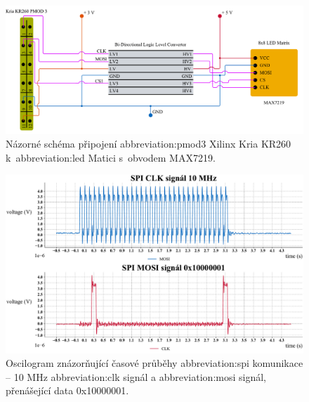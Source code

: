 \documentclass[a4paper, twoside, 11pt]{article}
\begin{document}
	\begin{figure}[htbp!]
		\centering
		\includegraphics[width=1\textwidth]{src/pdf/spi-test-connection.pdf}
		\caption{Názorné schéma připojení \gls{abbreviation:pmod}3 Xilinx Kria KR260 k~\gls{abbreviation:led} Matici s~obvodem MAX7219.}
		\label{fig:spi-test-connection}
	\end{figure}

	\begin{figure}[htbp!]
		\centering
		\includegraphics[width=1\textwidth]{src/python-graph/spi-osciloscope-data/pdf/clk-data-full-graph.pdf}
		\caption{Oscilogram znázorňující časové průběhy \gls{abbreviation:spi} komunikace – 10 MHz \gls{abbreviation:clk} signál a \gls{abbreviation:mosi} signál, přenášející data 0x10000001.}
		\label{fig:clk-data-full-graph}
	\end{figure}
\end{document}
